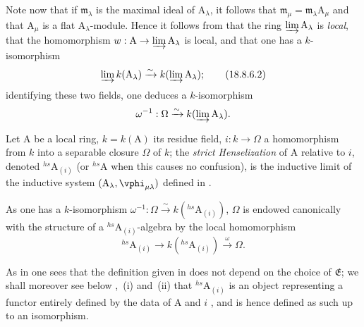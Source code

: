 \begin{env}[18.8.6]
Note now that if $\mathfrak{m}_\lambda$ is the maximal ideal of $\mathrm{A}_\lambda$, it follows that $\mathfrak{m}_\mu=\mathfrak{m}_\lambda\mathrm{A}_\mu$ and that $\mathrm{A}_\mu$ is a flat $\mathrm{A}_\lambda$-module.
Hence it follows from  that the ring $\varinjlim\mathrm{A}_\lambda$ is \emph{local}, that the homomorphism $w:\mathrm{A}\to\varinjlim\mathrm{A}_\lambda$ is local, and that one has a $k$-isomorphism
\begin{equation}
  \varinjlim k(\mathrm{A}_\lambda)\xrightarrow{\sim}k(\varinjlim\mathrm{A}_\lambda);
  \label{IV.18.8.6.2}
\tag{18.8.6.2}
\end{equation}
identifying these two fields, one deduces a $k$-isomorphism
\[
  \omega^{-1}:\Omega\xrightarrow{\sim}k(\varinjlim\mathrm{A}_\lambda).
\]
\end{env}

\begin{definition}[18.8.7]
\label{IV.18.8.7}
Let $\mathrm{A}$ be a local ring, $k=k(\mathrm{A})$ its residue field, $i:k\to\Omega$ a homomorphism from $k$ into a separable closure $\Omega$ of $k$;
the \emph{strict Henselization} of $\mathrm{A}$ relative to $i$, denoted ${}^{hs}\!\mathrm{A}_{(i)}$ (or ${}^{hs}\!\mathrm{A}$ when this causes no confusion), is the inductive limit of the inductive system $(\mathrm{A}_\lambda,\vphi_{\mu\lambda})$ defined in .
\end{definition}

As one has a $k$-isomorphism $\omega^{-1}:\Omega\xrightarrow{\sim}k({}^{hs}\!\mathrm{A}_{(i)})$, $\Omega$ is endowed canonically with the structure of a ${}^{hs}\!\mathrm{A}_{(i)}$-algebra by the local homomorphism
\[
  {}^{hs}\!\mathrm{A}_{(i)}\to k({}^{hs}\!\mathrm{A}_{(i)})\xrightarrow{\omega}\Omega.
\]

As in  one sees that the definition given in  does not depend on the choice of $\mathfrak{E}$;
we shall moreover see below ,~(i) and~(ii) that ${}^{hs}\!\mathrm{A}_{(i)}$ is an object representing a functor entirely defined by the data of A and $i$ , and is hence defined as such up to an isomorphism.

